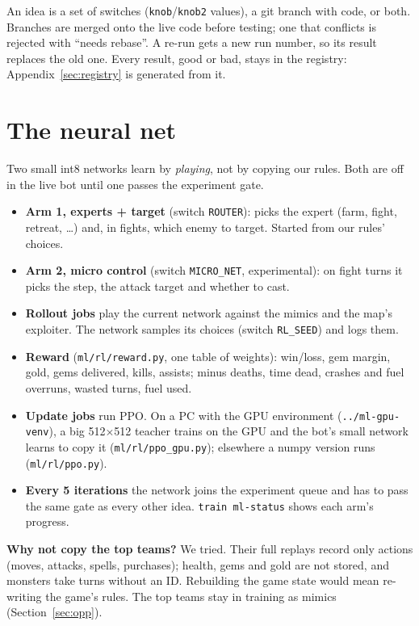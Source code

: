 \documentclass[11pt,a4paper]{article}
\newcommand{\f}[1]{\texttt{#1}}
\begin{document}
An idea is a set of switches (\f{knob}/\f{knob2} values), a git branch with code, or both. Branches are
merged onto the live code before testing; one that conflicts is rejected with ``needs rebase''. A
re-run gets a new run number, so its result replaces the old one. Every result, good or bad, stays in
the registry: Appendix~\ref{sec:registry} is generated from it.

\section{The neural net}\label{sec:nn}
Two small int8 networks learn by \emph{playing}, not by copying our rules. Both are off in the
live bot until one passes the experiment gate.
\begin{itemize}[nosep]
\item \textbf{Arm 1, experts + target} (switch \f{ROUTER}): picks the expert (farm, fight, retreat,
  \dots) and, in fights, which enemy to target. Started from our rules' choices.
\item \textbf{Arm 2, micro control} (switch \f{MICRO\_NET}, experimental): on fight turns it picks
  the step, the attack target and whether to cast.
\item \textbf{Rollout jobs} play the current network against the mimics and the map's exploiter.
  The network samples its choices (switch \f{RL\_SEED}) and logs them.
\item \textbf{Reward} (\f{ml/rl/reward.py}, one table of weights): win/loss, gem margin, gold,
  gems delivered, kills, assists; minus deaths, time dead, crashes and fuel overruns, wasted turns,
  fuel used.
\item \textbf{Update jobs} run PPO. On a PC with the GPU environment (\f{../ml-gpu-venv}), a big
  512$\times$512 teacher trains on the GPU and the bot's small network learns to copy it
  (\f{ml/rl/ppo\_gpu.py}); elsewhere a numpy version runs (\f{ml/rl/ppo.py}).
\item \textbf{Every 5 iterations} the network joins the experiment queue and has to pass the same gate
  as every other idea. \f{train ml-status} shows each arm's progress.
\end{itemize}
\textbf{Why not copy the top teams?} We tried. Their full replays record only actions (moves,
attacks, spells, purchases); health, gems and gold are not stored, and monsters take turns without an
ID. Rebuilding the game state would mean re-writing the game's rules. The top teams stay in training
as mimics (Section~\ref{sec:opp}).
\end{document}
